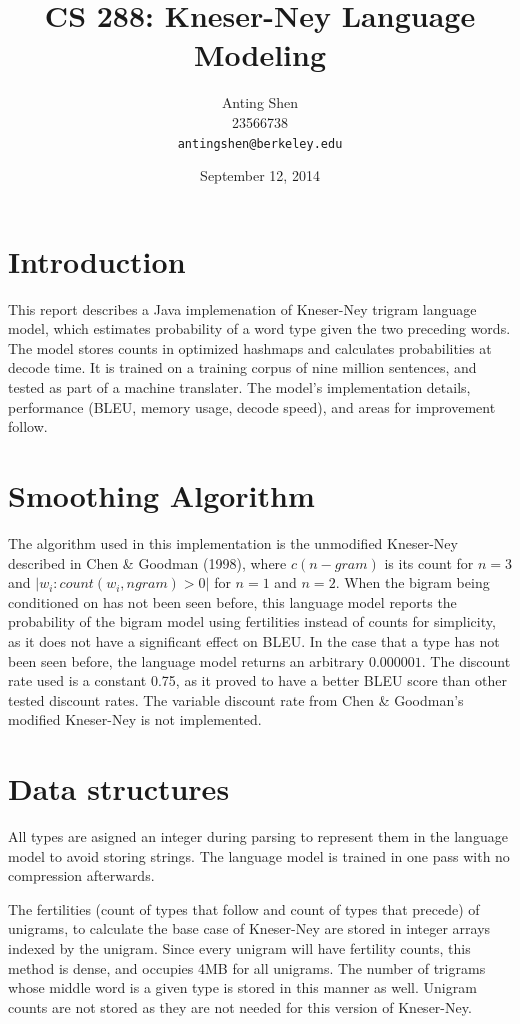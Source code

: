 \documentclass[11pt]{article}
\title{CS 288: Kneser-Ney Language Modeling}
\author{Anting Shen \\
  23566738 \\
  {\tt antingshen@berkeley.edu} \\
}
\date{September 12, 2014}
\begin{document}
\maketitle

\section{Introduction}

This report describes a Java implemenation of Kneser-Ney trigram language model, which estimates probability of a word type given the two preceding words. The model stores counts in optimized hashmaps and calculates probabilities at decode time. It is trained on a training corpus of nine million sentences, and tested as part of a machine translater. The model's implementation details, performance (BLEU, memory usage, decode speed), and areas for improvement follow.

\section{Smoothing Algorithm}

The algorithm used in this implementation is the unmodified Kneser-Ney described in Chen \& Goodman (1998), where $c(n-gram)$ is its count for $n=3$ and $|{w_i : count(w_i, ngram) > 0}|$ for $n=1$ and $n=2$. When the bigram being conditioned on has not been seen before, this language model reports the probability of the bigram model using fertilities instead of counts for simplicity, as it does not have a significant effect on BLEU. In the case that a type has not been seen before, the language model returns an arbitrary $0.000001$. The discount rate used is a constant 0.75, as it proved to have a better BLEU score than other tested discount rates. The variable discount rate from Chen \& Goodman's modified Kneser-Ney is not implemented.

\section{Data structures}

All types are asigned an integer during parsing to represent them in the language model to avoid storing strings. The language model is trained in one pass with no compression afterwards.

The fertilities (count of types that follow and count of types that precede) of unigrams, to calculate the base case of Kneser-Ney are stored in integer arrays indexed by the unigram. Since every unigram will have fertility counts, this method is dense, and occupies 4MB for all unigrams. The number of trigrams whose middle word is a given type is stored in this manner as well. Unigram counts are not stored as they are not needed for this version of Kneser-Ney.
\end{document}
